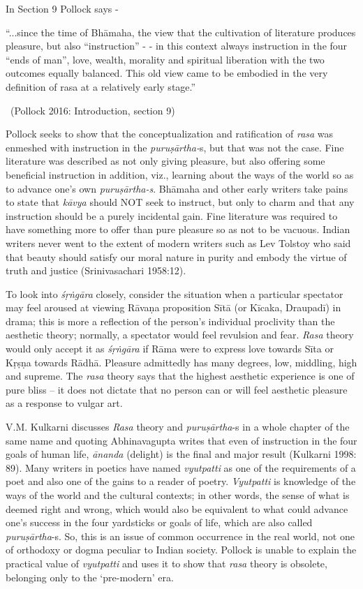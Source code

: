 In Section 9 Pollock says -

\begin{myquote}
“...since the time of Bhāmaha, the view that the cultivation of literature produces pleasure, but also “instruction” - - in this context always instruction in the four “ends of man”, love, wealth, morality and spiritual liberation with the two outcomes equally balanced. This old view came to be embodied in the very definition of rasa at a relatively early stage.” 

~\hfill (Pollock 2016: Introduction, section 9)
\end{myquote}

Pollock seeks to show that the conceptualization and ratification of \textit{rasa} was enmeshed with instruction in the \textit{puruṣārtha-}s, but that was not the case. Fine literature was described as not only giving pleasure, but also offering some beneficial instruction in addition, viz., learning about the ways of the world so as to advance one’s own \textit{puruṣārtha-s}. Bhāmaha and other early writers take pains to state that \textit{kāvya} should NOT seek to instruct, but only to charm and that any instruction should be a purely incidental gain. Fine literature was required to have something more to offer than pure pleasure so as not to be vacuous. Indian writers never went to the extent of modern writers such as Lev Tolstoy who said that beauty should satisfy our moral nature in purity and embody the virtue of truth and justice (Srinivasachari 1958:12).

To look into \textit{śṛṅgāra} closely, consider the situation when a particular spectator may feel aroused at viewing Rāvaṇa proposition Sītā (or Kīcaka, Draupadī) in drama; this is more a reflection of the person’s individual proclivity than the aesthetic theory; normally, a spectator would feel revulsion and fear. \textit{Rasa} theory would only accept it as \textit{śṛṅgāra} if Rāma were to express love towards Sīta or Kṛṣṇa towards Rādhā. Pleasure admittedly has many degrees, low, middling, high and supreme. The \textit{rasa} theory says that the highest aesthetic experience is one of pure bliss – it does not dictate that no person can or will feel aesthetic pleasure as a response to vulgar art.

V.M. Kulkarni discusses \textit{Rasa} theory and \textit{puruṣārtha}-s in a whole chapter of the same name and quoting Abhinavagupta writes that even of instruction in the four goals of human life, \textit{ānanda} (delight) is the final and major result (Kulkarni 1998: 89). Many writers in poetics have named \textit{vyutpatti} as one of the requirements of a poet and also one of the gains to a reader of poetry. \textit{Vyutpatti} is knowledge of the ways of the world and the cultural contexts; in other words, the sense of what is deemed right and wrong, which would also be equivalent to what could advance one’s success in the four yardsticks or goals of life, which are also called \textit{puruṣārtha}-s. So, this is an issue of common occurrence in the real world, not one of orthodoxy or dogma peculiar to Indian society. Pollock is unable to explain the practical value of \textit{vyutpatti }and uses it to show that \textit{rasa} theory is obsolete, belonging only to the ‘pre-modern’ era.

